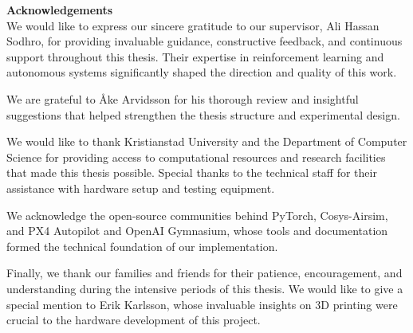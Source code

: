 \documentclass[../main.tex]{subfiles}
\begin{document}
\raggedright\textbf{Acknowledgements}\\
\justifying\noindent
We would like to express our sincere gratitude to our supervisor, Ali Hassan Sodhro, for providing invaluable guidance, constructive feedback, and continuous support throughout this thesis. Their expertise in reinforcement learning and autonomous systems significantly shaped the direction and quality of this work.

\justifying\noindent
We are grateful to \AA ke Arvidsson for his thorough review and insightful suggestions that helped strengthen the thesis structure and experimental design.

\justifying\noindent
We would like to thank Kristianstad University and the Department of Computer Science for providing access to computational resources and research facilities that made this thesis possible. Special thanks to the technical staff for their assistance with hardware setup and testing equipment.

\justifying\noindent
We acknowledge the open-source communities behind PyTorch, Cosys-Airsim, and PX4 Autopilot and OpenAI Gymnasium, whose tools and documentation formed the technical foundation of our implementation.

\justifying\noindent
Finally, we thank our families and friends for their patience, encouragement, and understanding during the intensive periods of this thesis. We would like to give a special mention to Erik Karlsson, whose invaluable insights on 3D printing were crucial to the hardware development of this project.
\end{document}
